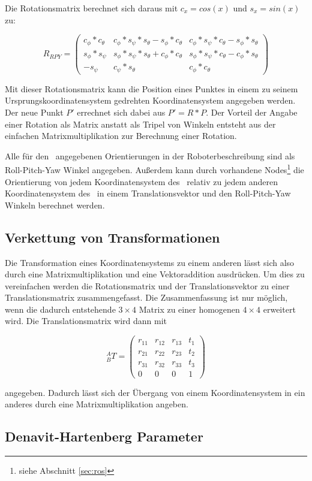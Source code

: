 Die Rotationsmatrix berechnet sich daraus mit $c_x=cos(x)$ und $s_x=sin(x)$ zu:

\begin{equation}
  R_{RPY}=
  \begin{pmatrix}
    c_\phi*c_\theta     
    & c_\phi*s_\psi*s_\theta-s_\phi*c_\theta
    & c_\phi*s_\psi*c_\theta-s_\phi*s_\theta\\

    s_\phi*s_\psi          
    & s_\phi*s_\psi*s_\theta+c_\phi*c_\theta
    & s_\phi*s_\psi*c_\theta-c_\phi*s_\theta\\
  
    -s_\psi    
    & c_\psi*s_\theta   
    & c_\phi*c_\theta
  
  \end{pmatrix}
\end{equation}
\cite{sciavicco2000modelling}

Mit dieser Rotationsmatrix kann die Position eines Punktes in einem zu seinem 
Ursprungskoordinatensystem gedrehten Koordinatensystem angegeben werden. 
Der neue Punkt $P'$ errechnet sich dabei aus $P' = R * P$.
Der Vorteil der Angabe einer Rotation als Matrix anstatt als Tripel von Winkeln
entsteht aus der einfachen Matrixmultiplikation zur Berechnung einer Rotation.
\cite{craig2005}

Alle für den \cob\ angegebenen Orientierungen in der Roboterbeschreibung sind 
als Roll-Pitch-Yaw Winkel angegeben. Außerdem kann durch vorhandene 
Nodes\footnote{siehe Abschnitt \ref{sec:ros}} 
die Orientierung von jedem Koordinatensystem des \cob\ relativ zu jedem 
anderen Koordinatensystem des \cob\ in einem Translationsvektor und den Roll-Pitch-Yaw
Winkeln berechnet werden.


\subsection{Verkettung von Transformationen}
\label{ssub:Verkettung von Transformationen}

Die Transformation eines Koordinatensystems zu einem anderen lässt sich also 
durch eine Matrixmultiplikation und eine Vektoraddition ausdrücken. 
Um dies zu vereinfachen werden die Rotationsmatrix und der Translationsvektor
zu einer Translationsmatrix zusammengefasst. Die Zusammenfassung ist nur 
möglich, wenn die dadurch entstehende $3\times4$ Matrix zu einer homogenen
$4\times4$ erweitert wird. Die Translationsmatrix wird dann mit 

\begin{equation}
  ^A_BT =\begin{pmatrix}
    r_{11}&r_{12}&r_{13}&t_1\\
    r_{21}&r_{22}&r_{23}&t_2\\
    r_{31}&r_{32}&r_{33}&t_3\\
    0&0&0&1
  \end{pmatrix}
\end{equation}

angegeben.
Dadurch lässt sich der Übergang von einem Koordinatensystem in ein anderes 
durch eine Matrixmultiplikation angeben.\cite{craig2005}



\subsection{Denavit-Hartenberg Parameter}
\label{ssub:Denavit-Hartenberg Parameter}


